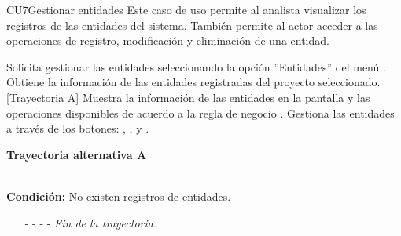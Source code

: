 	\begin{UseCase}{CU7}{Gestionar entidades}{
	Este caso de uso permite al analista visualizar los registros de las entidades del sistema. También permite al actor acceder a las operaciones de registro, modificación y eliminación de una entidad.
	}
	
\end{UseCase}
\begin{UCtrayectoria}
	\UCpaso[\UCactor] Solicita gestionar las entidades seleccionando la opción ''Entidades'' del menú .
	\UCpaso[\UCsist] Obtiene la información de las entidades registradas del proyecto seleccionado. \hyperlink{CU7:TAA}{[Trayectoria A]}
	\UCpaso[\UCsist] Muestra la información de las entidades en la pantalla  y las operaciones disponibles de acuerdo a la regla de negocio . \label{CU7-P4}
	\UCpaso[\UCactor] Gestiona las entidades a través de los botones: , \editar , \eliminar y . 
\end{UCtrayectoria}		
\hypertarget{CU7:TAA}{\textbf{Trayectoria alternativa A}}\\
\noindent \textbf{Condición:} No existen registros de entidades.
\begin{enumerate}
	\UCpaso[\UCsist] Muestra el mensaje  en la pantalla  para indicar que no hay registros de entidades para mostrar.  \label{CU7-TA1}
	\UCpaso[\UCactor] Gestiona las entidades a través del botón: . 
	\item[- -] - - {\em {Fin de la trayectoria}}.%
\end{enumerate}

